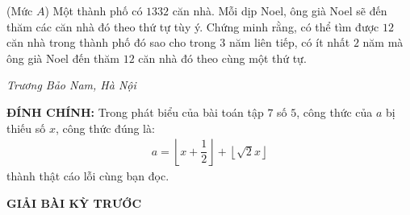 \begin{multicols}{2}
	{}
	(Mức $A$) Một thành phố có $1332$ căn nhà. Mỗi dịp Noel, ông già Noel sẽ đến thăm các căn nhà đó theo thứ tự tùy ý. Chứng minh rằng, có thể tìm được $12$ căn nhà trong thành phố đó sao cho trong $3$ năm liên tiếp, có ít nhất $2$ năm mà ông già Noel đến thăm $12$ căn nhà đó theo cùng một thứ tự.
	\begin{flushright}
		\textit{Trương Bảo Nam, Hà Nội}
	\end{flushright}
	\textbf{\color{thachthuctoanhoc}ĐÍNH CHÍNH:}
	Trong phát biểu của bài toán {} tập $7$ số $5$, công thức của $a$ bị thiếu số $x$, công thức đúng là:
	\begin{align*}
		a=\left\lfloor x+\dfrac12\right\rfloor+\left\lfloor\sqrt{2}x\right\rfloor
	\end{align*} thành thật cáo lỗi cùng bạn đọc.
\end{multicols}
\centerline{{\large{\textbf{\color{thachthuctoanhoc}GIẢI BÀI KỲ TRƯỚC}}}}
\vspace*{-5pt}
